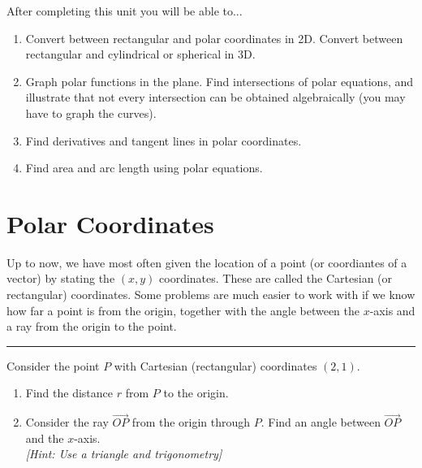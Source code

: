 
\noindent 
After completing this unit you will be able to...
\begin{enumerate}

\item Convert between rectangular and polar coordinates in 2D. Convert between rectangular and cylindrical or spherical in 3D.
\item Graph polar functions in the plane. Find intersections of polar equations, and illustrate that not every intersection can be obtained algebraically (you may have to graph the curves).
\item Find derivatives and tangent lines in polar coordinates.
\item Find area and arc length using polar equations.

\end{enumerate}

\section{Polar Coordinates}
Up to now, we have most often given the location of a point (or coordiantes of a vector) by stating the $(x,y)$ coordinates.  These are called the Cartesian (or rectangular) coordinates.  Some problems are much easier to work with if we know how far a point is from the origin, together with the angle between the $x$-axis and a ray from the origin to the point.

\hrule

\begin{problem}
%
Consider the point $P$ with Cartesian (rectangular) coordinates $(2,1)$.
\begin{enumerate}
\item Find the distance $r$ from $P$ to the origin. 
\item Consider the ray $\vec {OP}$ from the origin through $P$. Find an angle between $\vec{OP}$ and the $x$-axis.\\
\textit{[Hint: Use a triangle and trigonometry]}
\end{enumerate}

\end{problem}

